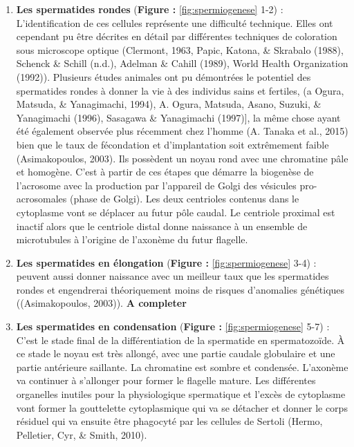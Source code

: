 \documentclass[12pt,twoside]{reedthesis}
\providecommand{\tightlist}{%
  \setlength{\itemsep}{0pt}\setlength{\parskip}{0pt}}
\theoremstyle{definition}
\theoremstyle{definition}
\theoremstyle{remark}
\begin{document}
  \begin{enumerate}
  \def\labelenumi{\arabic{enumi}.}
  \tightlist
  \item
    \textbf{Les spermatides rondes} (\textbf{Figure :
    }\ref{fig:spermiogenese} 1-2) : L'identification de ces cellules
    représente une difficulté technique. Elles ont cependant pu être
    décrites en détail par différentes techniques de coloration sous
    microscope optique (Clermont, 1963, Papic, Katona, \& Skrabalo (1988),
    Schenck \& Schill (n.d.), Adelman \& Cahill (1989), World Health
    Organization (1992)). Plusieurs études animales ont pu démontrées le
    potentiel des spermatides rondes à donner la vie à des individus sains
    et fertiles, (a Ogura, Matsuda, \& Yanagimachi, 1994), A. Ogura,
    Matsuda, Asano, Suzuki, \& Yanagimachi (1996), Sasagawa \& Yanagimachi
    (1997){]}, la même chose ayant été également observée plus récemment
    chez l'homme (A. Tanaka et al., 2015) bien que le taux de fécondation
    et d'implantation soit extrêmement faible (Asimakopoulos, 2003). Ils
    possèdent un noyau rond avec une chromatine pâle et homogène. C'est à
    partir de ces étapes que démarre la biogenèse de l'acrosome avec la
    production par l'appareil de Golgi des vésicules pro-acrosomales
    (phase de Golgi). Les deux centrioles contenus dans le cytoplasme vont
    se déplacer au futur pôle caudal. Le centriole proximal est inactif
    alors que le centriole distal donne naissance à un ensemble de
    microtubules à l'origine de l'axonème du futur flagelle.\\
  \item
    \textbf{Les spermatides en élongation} (\textbf{Figure :
    }\ref{fig:spermiogenese} 3-4) :\\
    peuvent aussi donner naissance avec un meilleur taux que les
    spermatides rondes et engendrerai théoriquement moins de risques
    d'anomalies génétiques ((Asimakopoulos, 2003)). \textbf{A completer}\\
  \item
    \textbf{Les spermatides en condensation} (\textbf{Figure :
    }\ref{fig:spermiogenese} 5-7) : C'est le stade final de la
    différentiation de la spermatide en spermatozoïde. À ce stade le noyau
    est très allongé, avec une partie caudale globulaire et une partie
    antérieure saillante. La chromatine est sombre et condensée. L'axonème
    va continuer à s'allonger pour former le flagelle mature. Les
    différentes organelles inutiles pour la physiologique spermatique et
    l'excès de cytoplasme vont former la gouttelette cytoplasmique qui va
    se détacher et donner le corps résiduel qui va ensuite être phagocyté
    par les cellules de Sertoli (Hermo, Pelletier, Cyr, \& Smith, 2010).
  \end{enumerate}
  
\end{document}
